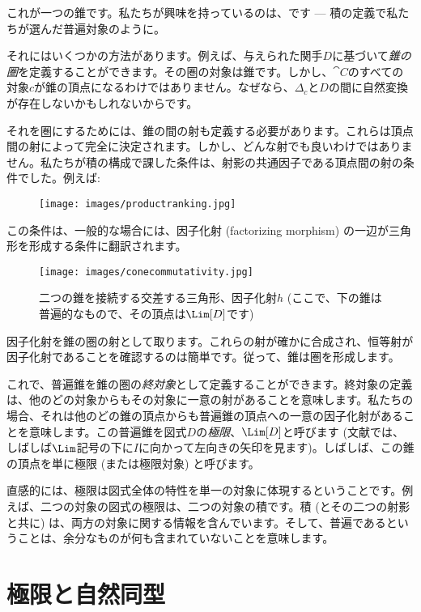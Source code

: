 \noindent
これが一つの錐です。私たちが興味を持っているのは、です --- 積の定義で私たちが選んだ普遍対象のように。

それにはいくつかの方法があります。例えば、与えられた関手$D$に基づいて\emph{錐の圏}を定義することができます。その圏の対象は錐です。しかし、$\cat{C}$のすべての対象$c$が錐の頂点になるわけではありません。なぜなら、$\Delta_c$と$D$の間に自然変換が存在しないかもしれないからです。

それを圏にするためには、錐の間の射も定義する必要があります。これらは頂点間の射によって完全に決定されます。しかし、どんな射でも良いわけではありません。私たちが積の構成で課した条件は、射影の共通因子である頂点間の射の条件でした。例えば: 


\begin{figure}[H]
  \centering
  \texttt{[image: images/productranking.jpg]}
\end{figure}

この条件は、一般的な場合には、因子化射 (factorizing morphism) の一辺が三角形を形成する条件に翻訳されます。

\begin{figure}[H]
  \centering
  \texttt{[image: images/conecommutativity.jpg]}
  \caption{二つの錐を接続する交差する三角形、因子化射$h$ (ここで、下の錐は普遍的なもので、その頂点は$\Lim[D]$です) }
\end{figure}

\noindent
因子化射を錐の圏の射として取ります。これらの射が確かに合成され、恒等射が因子化射であることを確認するのは簡単です。従って、錐は圏を形成します。

これで、普遍錐を錐の圏の\emph{終対象}として定義することができます。終対象の定義は、他のどの対象からもその対象に一意の射があることを意味します。私たちの場合、それは他のどの錐の頂点からも普遍錐の頂点への一意の因子化射があることを意味します。この普遍錐を図式$D$の\emph{極限}、$\Lim[D]$と呼びます (文献では、しばしば$\Lim$記号の下に$I$に向かって左向きの矢印を見ます)。しばしば、この錐の頂点を単に極限 (または極限対象) と呼びます。

直感的には、極限は図式全体の特性を単一の対象に体現するということです。例えば、二つの対象の図式の極限は、二つの対象の積です。積 (とその二つの射影と共に) は、両方の対象に関する情報を含んでいます。そして、普遍であるということは、余分なものが何も含まれていないことを意味します。

\section{極限と自然同型}

